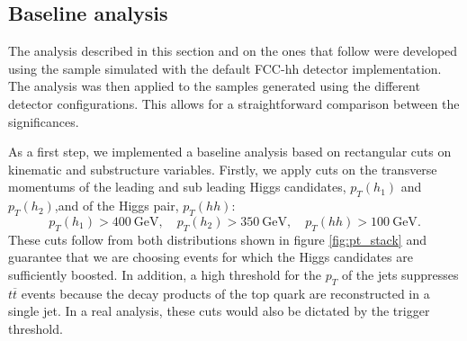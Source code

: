 %
%
%

\subsection{Baseline analysis}

The analysis described in this section and on the ones that follow were developed using the sample simulated with the default FCC-hh detector implementation. The analysis was then applied to the samples generated using the different detector configurations. This allows for a straightforward comparison between the significances.

As a first step, we implemented a baseline analysis based on rectangular cuts on kinematic and substructure variables. Firstly, we apply cuts on the transverse momentums of the leading and sub leading Higgs candidates, $p_T(h_1)$ and $p_T(h_2)$,and of the Higgs pair, $p_T(hh)$:
\begin{equation}
	p_T(h_1)>400 ~\text{GeV}, \quad p_T(h_2)>350 ~\text{GeV}, \quad p_T(hh)>100 ~\text{GeV}.
\end{equation}
These cuts follow from both distributions shown in figure \ref{fig:pt_stack} and guarantee that we are choosing events for which the Higgs candidates are sufficiently boosted. In addition, a high threshold for the $p_T$ of the jets suppresses $t\overline{t}$ events because the decay products of the top quark are reconstructed in a single jet. In a real analysis, these cuts would also be dictated by the trigger threshold. 

